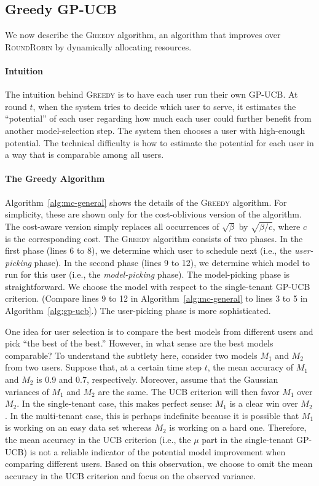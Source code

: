 \documentclass[letterpaper]{vldb}
\newcommand{\rr}{\textsc{RoundRobin}\xspace}
\newcommand{\greedy}{\textsc{Greedy}\xspace}
\begin{document}
\subsection{Greedy GP-UCB}

We now describe the \greedy algorithm, an 
algorithm that improves over \rr by 
dynamically allocating resources.

\paragraph*{Intuition}
The intuition behind \greedy is to have
each user run their own GP-UCB. At round
$t$, when the system tries to decide which
user to serve, it estimates the
``potential'' of each user regarding how much each
user could further benefit from another
model-selection step. The system then
chooses a user with high-enough potential.
The technical difficulty is how to
estimate the potential for each user 
in a way that is comparable among all users.

\paragraph*{The Greedy Algorithm}

Algorithm~\ref{alg:mc-general} shows the details 
of the \greedy algorithm. For simplicity,
these are shown only for the cost-oblivious version of the algorithm. The cost-aware version simply replaces all occurrences of $\sqrt{\beta}$ by $\sqrt{\beta/c}$, where $c$ is the corresponding cost.
The \greedy algorithm consists of two phases.
In the first phase (lines 6 to 8), we determine which user to schedule next (i.e., the \emph{user-picking} phase).
In the second phase (lines 9 to 12), we determine which model to run for this user (i.e., the \emph{model-picking} phase).
The model-picking phase is straightforward. We choose the model with respect to the single-tenant GP-UCB criterion. (Compare lines 9 to 12 in Algorithm~\ref{alg:mc-general} to lines 3 to 5 in Algorithm~\ref{alg:gp-ucb}.)
The user-picking phase is more sophisticated.


One idea for user selection is to compare the best models from different users and pick ``the best of the best.''
However, in what sense are the best models comparable?
To understand the subtlety here, consider two models $M_1$ and $M_2$ from two users.
Suppose that, at a certain time step $t$, the mean accuracy of $M_1$ and $M_2$ is 0.9 and 0.7, respectively.
Moreover, assume that the Gaussian variances of $M_1$ and $M_2$ are the same.
The UCB criterion will then favor $M_1$ over $M_2$.
In the single-tenant case, this makes perfect sense: $M_1$ is a clear win over $M_2$.
In the multi-tenant case, this is perhaps indefinite because it is possible that $M_1$ is working on an easy data set whereas $M_2$ is working on a hard one.
Therefore, the mean accuracy in the UCB criterion (i.e., the $\mu$ part in the single-tenant GP-UCB) is not a reliable indicator of the potential model improvement when comparing different users.
Based on this observation, we choose to omit the mean accuracy in the UCB criterion and focus on the observed variance.
\end{document}
